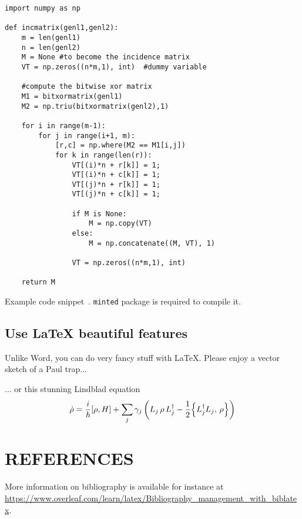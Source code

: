 \begin{longlisting}
\begin{verbatim}
import numpy as np
    
def incmatrix(genl1,genl2):
    m = len(genl1)
    n = len(genl2)
    M = None #to become the incidence matrix
    VT = np.zeros((n*m,1), int)  #dummy variable
    
    #compute the bitwise xor matrix
    M1 = bitxormatrix(genl1)
    M2 = np.triu(bitxormatrix(genl2),1) 

    for i in range(m-1):
        for j in range(i+1, m):
            [r,c] = np.where(M2 == M1[i,j])
            for k in range(len(r)):
                VT[(i)*n + r[k]] = 1;
                VT[(i)*n + c[k]] = 1;
                VT[(j)*n + r[k]] = 1;
                VT[(j)*n + c[k]] = 1;
                
                if M is None:
                    M = np.copy(VT)
                else:
                    M = np.concatenate((M, VT), 1)
                
                VT = np.zeros((n*m,1), int)
    
    return M
\end{verbatim}
\caption{Example code snippet~\cite{code}. \texttt{minted} package is required to compile it.}
\label{code:example}
\end{longlisting}
\fi




\subsection{Use LaTeX beautiful features}


Unlike Word, you can do very fancy stuff with \LaTeX. Please enjoy a vector sketch of a Paul trap...

\begin{center}
\scalebox{1.2}{
    
}
\end{center}
... or this stunning Lindblad equation
\begin{equation}
    \dot{\rho} = \frac{i}{\hbar} [\rho,H] + \sum_j \gamma_j \left( L_j \, \rho \,  L_j^\dagger - \frac{1}{2} \Bigl\{ L_j^\dagger L_j, \, \rho \Bigr\} \right)
    \label{eq:Lindblad}
\end{equation}





\section*{REFERENCES}
\printbibliography[heading=none]

\noindent More information on bibliography is available for instance at \url{https://www.overleaf.com/learn/latex/Bibliography_management_with_biblatex}.
